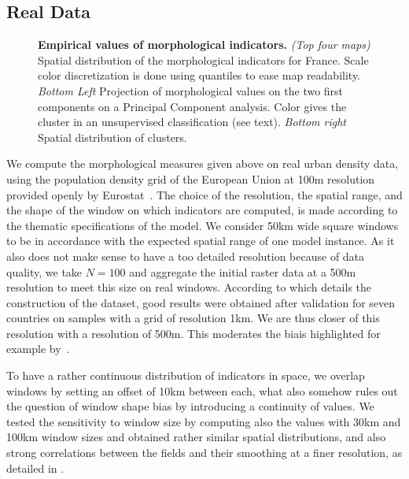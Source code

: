 \documentclass[10pt,letterpaper]{article}
\begin{document}
\subsection*{Real Data}



\begin{figure}[!h]
\caption{\textbf{Empirical values of morphological indicators.} \textit{(Top four maps)} Spatial distribution of the morphological indicators for France. Scale color discretization is done using quantiles to ease map readability. \textit{Bottom Left} Projection of morphological values on the two first components on a Principal Component analysis. Color gives the cluster in an unsupervised classification (see text). \textit{Bottom right} Spatial distribution of clusters.}
\label{fig:fig1}
\end{figure}



We compute the morphological measures given above on real urban density data, using the population density grid of the European Union at 100m resolution provided openly by Eurostat~\cite{eurostat}. The choice of the resolution, the spatial range, and the shape of the window on which indicators are computed, is made according to the thematic specifications of the model. We consider 50km wide square windows to be in accordance with the expected spatial range of one model instance. As it also does not make sense to have a too detailed resolution because of data quality, we take $N=100$ and aggregate the initial raster data at a 500m resolution to meet this size on real windows. According to \cite{batista2013high} which details the construction of the dataset, good results were obtained after validation for seven countries on samples with a grid of resolution 1km. We are thus closer of this resolution with a resolution of 500m. This moderates the biais highlighted for example by~\cite{bretagnolle2016ville}.


To have a rather continuous distribution of indicators in space, we overlap windows by setting an offset of 10km between each, what also somehow rules out the question of window shape bias by introducing a continuity of values. We tested the sensitivity to window size by computing also the values with 30km and 100km window sizes and obtained rather similar spatial distributions, and also strong correlations between the fields and their smoothing at a finer resolution, as detailed in .
\end{document}
